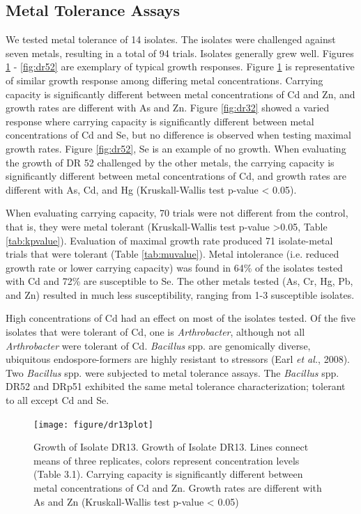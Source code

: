 \documentclass[ms, hidelinks]{uncgdissertationexp3}
\theoremstyle{plain}
\theoremstyle{definition}
\theoremstyle{remark}
\newcommand{\titlecaption}[2]{\caption[#1]{#1. #2}}
\begin{document}
\subsection{Metal Tolerance Assays}\label{metal-tolerance-assays}
We tested metal tolerance of 14 isolates. The isolates were challenged against seven metals, resulting in a total of 94 trials. Isolates generally grew well. Figures \ref{fig:dr13} - \ref{fig:dr52} are exemplary of typical growth responses. Figure \ref{fig:dr13} is representative of similar growth response among differing metal concentrations. Carrying capacity is significantly different between metal concentrations of Cd and Zn, and growth rates are different with As and Zn. Figure \ref{fig:dr32} showed a varied response where carrying capacity is significantly different between metal concentrations of Cd and Se, but no difference is observed when testing maximal growth rates. Figure \ref{fig:dr52}, Se is an example of no growth. When evaluating the growth of DR 52 challenged by the other metals, the carrying capacity is significantly different between metal concentrations of Cd, and growth rates are different with As, Cd, and Hg (Kruskall-Wallis test p-value < 0.05). 

When evaluating carrying capacity, 70 trials were not different from the control, that is, they were metal tolerant (Kruskall-Wallis test p-value \textgreater0.05, Table \ref{tab:kpvalue}). Evaluation of maximal growth rate produced 71 isolate-metal trials that were tolerant (Table \ref{tab:muvalue}). Metal intolerance (i.e. reduced growth rate or lower carrying capacity) was found in 64\% of the isolates tested with Cd and 72\% are susceptible to Se. The other metals tested (As, Cr, Hg, Pb, and Zn) resulted in much less susceptibility, ranging from 1-3 susceptible isolates.

High concentrations of Cd had an effect on most of the isolates tested. Of the five isolates that were tolerant of Cd, one is \emph{Arthrobacter}, although not all \emph{Arthrobacter} were tolerant of Cd. \emph{Bacillus} spp. are genomically diverse, ubiquitous endospore-formers are highly resistant to stressors (Earl \emph{et al.}, 2008). Two \emph{Bacillus} spp. were subjected to metal tolerance assays. The \emph{Bacillus} spp. DR52 and DRp51 exhibited the same metal tolerance characterization; tolerant to all except Cd and Se.

\begin{figure}[t]
  \centering
  \texttt{[image: figure/dr13plot]}
  \titlecaption{Growth of Isolate DR13}{Growth of Isolate DR13. Lines connect means of three replicates, colors represent concentration levels (Table 3.1). Carrying capacity is significantly different between metal concentrations of Cd and Zn.  Growth rates are different with As and Zn (Kruskall-Wallis test p-value < 0.05)}
  \label{fig:dr13}
\end{figure}
\end{document}
